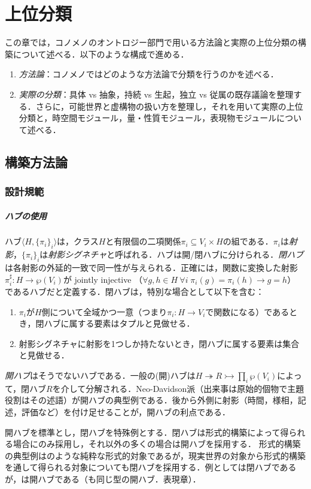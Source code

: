 \documentclass[../../main-detail.tex]{subfiles}
\begin{document}
\chapter{上位分類}
この章では，コノメノのオントロジー部門で用いる方法論と実際の上位分類の構築について述べる．以下のような構成で進める．
\begin{enumerate}
    \item \emph{方法論}：コノメノではどのような方法論で分類を行うのかを述べる．
    \item \emph{実際の分類}：具体 vs 抽象，持続 vs 生起，独立 vs 従属の既存議論を整理する．さらに，可能世界と虚構物の扱い方を整理し，それを用いて実際の上位分類と，時空間モジュール，量・性質モジュール，表現物モジュールについて述べる．
\end{enumerate}
\section{構築方法論}
\subsection{設計規範}
\paragraph{ハブの使用} ハブ$\langle H, \{\pi_i\}_i\rangle$は，クラス$H$と有限個の二項関係$\pi_i\subseteq V_i\times H$の組である．$\pi_i$は\emph{射影}，$\{\pi_i\}_i$は\emph{射影シグネチャ}と呼ばれる．ハブは開/閉ハブに分けられる．\emph{閉ハブ}は各射影の外延的一致で同一性が与えられる．正確には，関数に変換した射影$\pi_i^\sharp : H \to \wp(V_i)$が jointly injective
（$\forall g,h\in H\ \forall i\;\pi_i(g)=\pi_i(h)\to g=h$）
であるハブだと定義する．閉ハブは，特別な場合として以下を含む：
\begin{enumerate}
    \item $\pi_i$が$H$側について全域かつ一意（つまり$\pi_i : H\to V_i$で関数になる）であるとき，閉ハブに属する要素はタプルと見做せる．
    \item 射影シグネチャに射影を1つしか持たないとき，閉ハブに属する要素は集合と見做せる．
\end{enumerate}
\emph{開ハブ}はそうでないハブである．一般の(開)ハブは$H\twoheadrightarrow R\rightarrowtail \prod_i \wp(V_i)$によって，閉ハブ$R$を介して分解される．Neo-Davidson派（出来事は原始的個物で主題役割はその述語）が開ハブの典型例である．後から外側に射影（時間，様相，記述，評価など）を付け足せることが，開ハブの利点である．

開ハブを標準とし，閉ハブを特殊例とする．閉ハブは形式的構築によって得られる場合にのみ採用し，それ以外の多くの場合は開ハブを採用する．
形式的構築の典型例はのような純粋な形式的対象であるが，現実世界の対象から形式的構築を通して得られる対象についても閉ハブを採用する．例としては閉ハブであるが，は開ハブである（も同じ型の開ハブ．表現章）．
\end{document}
